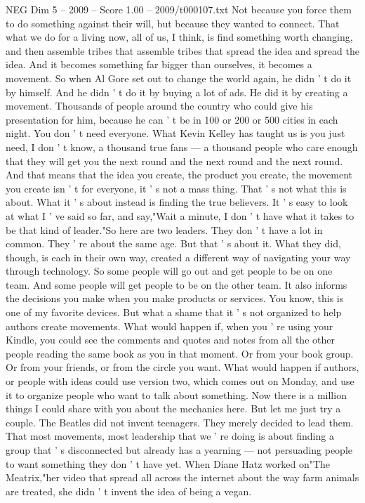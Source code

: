 \begin{textsample}{NEG Dim 5 – 2009 – Score 1.00 – 2009/t000107.txt}
Not because you force them to do something against their will, but because they wanted to connect.
That what we do for a living now, all of us, I think, is find something worth changing, and then assemble tribes that assemble tribes that spread the idea and spread the idea.
And it becomes something far bigger than ourselves, it becomes a movement.
So when Al Gore set out to change the world again, he didn ' t do it by himself.
And he didn ' t do it by buying a lot of ads.
He did it by creating a movement.
Thousands of people around the country who could give his presentation for him, because he can ' t be in 100 or 200 or 500 cities in each night.
You don ' t need everyone.
What Kevin Kelley has taught us is you just need, I don ' t know, a thousand true fans — a thousand people who care enough that they will get you the next round and the next round and the next round.
And that means that the idea you create, the product you create, the movement you create isn ' t for everyone, it ' s not a mass thing.
That ' s not what this is about.
What it ' s about instead is finding the true believers.
It ' s easy to look at what I ' ve said so far, and say,"Wait a minute, I don ' t have what it takes to be that kind of leader."So here are two leaders.
They don ' t have a lot in common.
They ' re about the same age.
But that ' s about it.
What they did, though, is each in their own way, created a different way of navigating your way through technology.
So some people will go out and get people to be on one team.
And some people will get people to be on the other team.
It also informs the decisions you make when you make products or services.
You know, this is one of my favorite devices.
But what a shame that it ' s not organized to help authors create movements.
What would happen if, when you ' re using your Kindle, you could see the comments and quotes and notes from all the other people reading the same book as you in that moment.
Or from your book group.
Or from your friends, or from the circle you want.
What would happen if authors, or people with ideas could use version two, which comes out on Monday, and use it to organize people who want to talk about something.
Now there is a million things I could share with you about the mechanics here.
But let me just try a couple.
The Beatles did not invent teenagers.
They merely decided to lead them.
That most movements, most leadership that we ' re doing is about finding a group that ' s disconnected but already has a yearning — not persuading people to want something they don ' t have yet.
When Diane Hatz worked on"The Meatrix,"her video that spread all across the internet about the way farm animals are treated, she didn ' t invent the idea of being a vegan.

\end{textsample}
